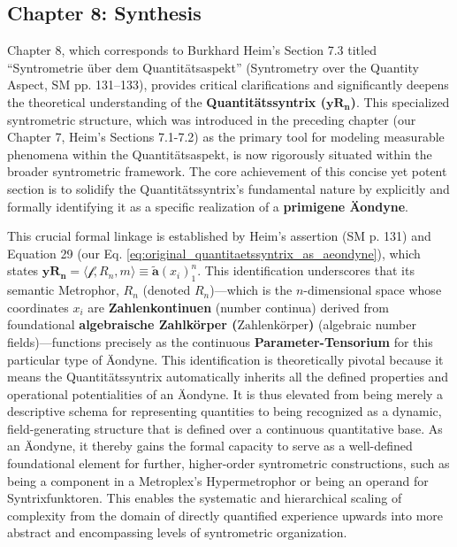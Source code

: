 \documentclass[12pt]{article}
\newcommand{\q}[1]{\enquote{#1}}
\newcommand{\synkolationsstufe}{m}
\newcommand{\quantitaetssyntrix}{\bm{yR_n}}
\newcommand{\zahlenkoerper}{\text{Zahlenkörper}}
\newcommand{\semantischermetrophor}{R_n}
\newcommand{\funktionaloperator}{\mathcal{f}}
\newcommand{\aeondynechaptereight}{\mathbf{\widetilde{a}}(x_i)^n_1}
\begin{document}
\subsection{Chapter 8: Synthesis}
\label{sec:chapter8_synthesis}

Chapter 8, which corresponds to Burkhard Heim's Section 7.3 titled \q{Syntrometrie über dem Quantitätsaspekt} (Syntrometry over the Quantity Aspect, SM pp. 131–133), provides critical clarifications and significantly deepens the theoretical understanding of the \textbf{Quantitätssyntrix (\(\quantitaetssyntrix\))}. This specialized syntrometric structure, which was introduced in the preceding chapter (our Chapter 7, Heim's Sections 7.1-7.2) as the primary tool for modeling measurable phenomena within the Quantitätsaspekt, is now rigorously situated within the broader syntrometric framework. The core achievement of this concise yet potent section is to solidify the Quantitätssyntrix's fundamental nature by explicitly and formally identifying it as a specific realization of a \textbf{primigene Äondyne}.

This crucial formal linkage is established by Heim's assertion (SM p. 131) and Equation 29 (our Eq. \eqref{eq:original_quantitaetssyntrix_as_aeondyne}), which states \( \quantitaetssyntrix = \langle \funktionaloperator, \semantischermetrophor, \synkolationsstufe \rangle \equiv \aeondynechaptereight \). This identification underscores that its semantic Metrophor, \( \semantischermetrophor \) (denoted \(R_n\))—which is the \( n \)-dimensional space whose coordinates \( x_i \) are \textbf{Zahlenkontinuen} (number continua) derived from foundational \textbf{algebraische Zahlkörper (\(\zahlenkoerper\))} (algebraic number fields)—functions precisely as the continuous \textbf{Parameter-Tensorium} for this particular type of Äondyne. This identification is theoretically pivotal because it means the Quantitätssyntrix automatically inherits all the defined properties and operational potentialities of an Äondyne. It is thus elevated from being merely a descriptive schema for representing quantities to being recognized as a dynamic, field-generating structure that is defined over a continuous quantitative base. As an Äondyne, it thereby gains the formal capacity to serve as a well-defined foundational element for further, higher-order syntrometric constructions, such as being a component in a Metroplex's Hypermetrophor or being an operand for Syntrixfunktoren. This enables the systematic and hierarchical scaling of complexity from the domain of directly quantified experience upwards into more abstract and encompassing levels of syntrometric organization.
\end{document}
